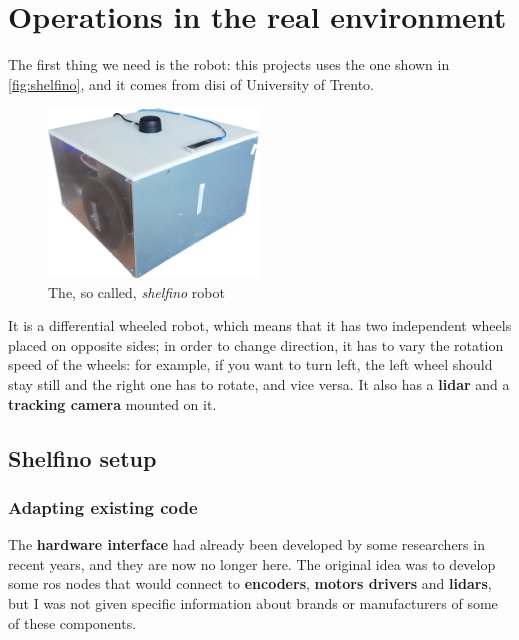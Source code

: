 \chapter{Operations in the real environment}
\label{cha:realworld}

The first thing we need is the robot: this projects uses the one shown in \autoref{fig:shelfino}, and it comes from \acrfull{disi} of University of Trento.

\bigskip

\begin{figure}[h]
  \centering
  \includegraphics[width=0.5\textwidth]{images/shelfino}
  \caption{The, so called, \textit{shelfino} robot}
  \label{fig:shelfino}
\end{figure}

\medskip

It is a differential wheeled robot, which means that it has two independent wheels placed on opposite sides; in order to change direction, it has to vary the rotation speed of the wheels: for example, if you want to turn left, the left wheel should stay still and the right one has to rotate, and vice versa. It also has a \textbf{lidar} and a \textbf{tracking camera} mounted on it.

\section{Shelfino setup} 

\subsection{Adapting existing code}

The \textbf{hardware interface} had already been developed by some researchers in recent years, and they are now no longer here. The original idea was to develop some \acrshort{ros} nodes that would connect to \textbf{encoders}, \textbf{motors drivers} and \textbf{lidars}, but I was not given specific information about brands or manufacturers of some of these components.

